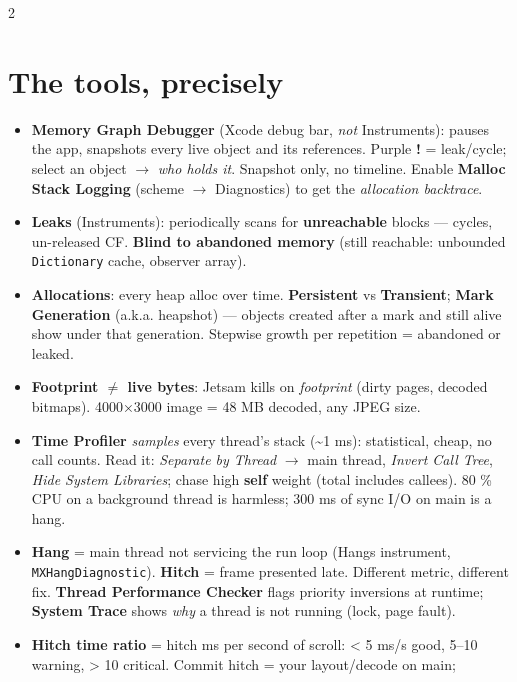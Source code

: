 \documentclass[8pt]{extarticle}
\begin{document}
\begin{multicols}{2}
\raggedright

\section{The tools, precisely}
\begin{itemize}
  \item \textbf{Memory Graph Debugger} (Xcode debug bar, \emph{not} Instruments):
        pauses the app, snapshots every live object and its references. Purple
        \textbf{!} = leak/cycle; select an object $\to$ \emph{who holds it}. Snapshot
        only, no timeline. Enable \textbf{Malloc Stack Logging} (scheme $\to$
        Diagnostics) to get the \emph{allocation backtrace}.
  \item \textbf{Leaks} (Instruments): periodically scans for \textbf{unreachable}
        blocks — cycles, un-released CF. \textbf{Blind to abandoned memory}
        (still reachable: unbounded \texttt{Dictionary} cache, observer array).
  \item \textbf{Allocations}: every heap alloc over time. \textbf{Persistent} vs
        \textbf{Transient}; \textbf{Mark Generation} (a.k.a. heapshot) — objects
        created after a mark and still alive show under that generation. Stepwise
        growth per repetition = abandoned or leaked.
  \item \textbf{Footprint $\neq$ live bytes}: Jetsam kills on \emph{footprint}
        (dirty pages, decoded bitmaps). 4000×3000 image = 48 MB decoded, any JPEG size.
  \item \textbf{Time Profiler} \emph{samples} every thread's stack (\textasciitilde1 ms):
        statistical, cheap, no call counts. Read it: \emph{Separate by Thread}
        $\to$ main thread, \emph{Invert Call Tree}, \emph{Hide System Libraries};
        chase high \textbf{self} weight (total includes callees). 80 \% CPU on a
        background thread is harmless; 300 ms of sync I/O on main is a hang.
  \item \textbf{Hang} = main thread not servicing the run loop (Hangs instrument,
        \texttt{MXHangDiagnostic}). \textbf{Hitch} = frame presented late. Different
        metric, different fix. \textbf{Thread Performance Checker} flags priority
        inversions at runtime; \textbf{System Trace} shows \emph{why} a thread is not
        running (lock, page fault).
  \item \textbf{Hitch time ratio} = hitch ms per second of scroll: < 5 ms/s good,
        5–10 warning, > 10 critical. Commit hitch = your layout/decode on main;

\end{itemize}
\end{multicols}
\end{document}

